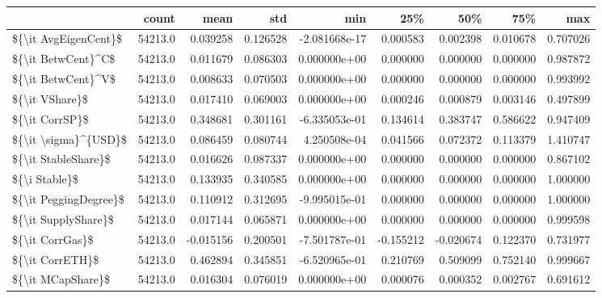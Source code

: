\begin{tabular}{lrrrrrrrr}
\toprule
{} &    count &      mean &       std &           min &       25\% &       50\% &       75\% &       max \\
\midrule
\$\{\textbackslash it AvgEigenCent\}\$  &  54213.0 &  0.039258 &  0.126528 & -2.081668e-17 &  0.000583 &  0.002398 &  0.010678 &  0.707026 \\
\$\{\textbackslash it BetwCent\}\textasciicircum C\$    &  54213.0 &  0.011679 &  0.086303 &  0.000000e+00 &  0.000000 &  0.000000 &  0.000000 &  0.987872 \\
\$\{\textbackslash it BetwCent\}\textasciicircum V\$    &  54213.0 &  0.008633 &  0.070503 &  0.000000e+00 &  0.000000 &  0.000000 &  0.000000 &  0.993992 \\
\$\{\textbackslash it VShare\}\$        &  54213.0 &  0.017410 &  0.069003 &  0.000000e+00 &  0.000246 &  0.000879 &  0.003146 &  0.497899 \\
\$\{\textbackslash it CorrSP\}\$        &  54213.0 &  0.348681 &  0.301161 & -6.335053e-01 &  0.134614 &  0.383747 &  0.586622 &  0.947409 \\
\$\{\textbackslash it \textbackslash sigma\}\textasciicircum \{USD\}\$  &  54213.0 &  0.086459 &  0.080744 &  4.250508e-04 &  0.041566 &  0.072372 &  0.113379 &  1.410747 \\
\$\{\textbackslash it StableShare\}\$   &  54213.0 &  0.016626 &  0.087337 &  0.000000e+00 &  0.000000 &  0.000000 &  0.000000 &  0.867102 \\
\$\{\textbackslash i Stable\}\$         &  54213.0 &  0.133935 &  0.340585 &  0.000000e+00 &  0.000000 &  0.000000 &  0.000000 &  1.000000 \\
\$\{\textbackslash it PeggingDegree\}\$ &  54213.0 &  0.110912 &  0.312695 & -9.995015e-01 &  0.000000 &  0.000000 &  0.000000 &  1.000000 \\
\$\{\textbackslash it SupplyShare\}\$   &  54213.0 &  0.017144 &  0.065871 &  0.000000e+00 &  0.000000 &  0.000000 &  0.000000 &  0.999598 \\
\$\{\textbackslash it CorrGas\}\$       &  54213.0 & -0.015156 &  0.200501 & -7.501787e-01 & -0.155212 & -0.020674 &  0.122370 &  0.731977 \\
\$\{\textbackslash it CorrETH\}\$       &  54213.0 &  0.462894 &  0.345851 & -6.520965e-01 &  0.210769 &  0.509099 &  0.752140 &  0.999667 \\
\$\{\textbackslash it MCapShare\}\$     &  54213.0 &  0.016304 &  0.076019 &  0.000000e+00 &  0.000076 &  0.000352 &  0.002767 &  0.691612 \\
\bottomrule
\end{tabular}
